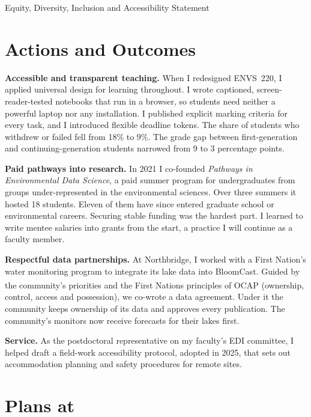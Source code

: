 \begin{applicationdocument}[
  short      = {EDIA Statement},
  page limit = 2,
]{Equity, Diversity, Inclusion and Accessibility Statement}
\section{Actions and Outcomes}


\textbf{Accessible and transparent teaching.} When I redesigned ENVS~220, I
applied universal design for learning throughout. I wrote captioned,
screen-reader-tested notebooks that run in a browser, so students need
neither a powerful laptop nor any installation. I published explicit
marking criteria for every task, and I introduced flexible deadline tokens.
The share of students who withdrew or failed fell from 18\% to 9\%. The
grade gap between first-generation and continuing-generation students
narrowed from 9 to 3 percentage points.

\textbf{Paid pathways into research.} In 2021 I co-founded \emph{Pathways in
Environmental Data Science}, a paid summer program for undergraduates
from groups under-represented in the environmental sciences. Over three
summers it hosted 18 students. Eleven of them have since entered graduate
school or environmental careers. Securing stable funding was the
hardest part. I learned to write mentee salaries into grants from the
start, a practice I will continue as a faculty member.

\textbf{Respectful data partnerships.} At Northbridge, I worked with a
First Nation's water monitoring program to integrate its lake data into
BloomCast. Guided by the community's priorities and the First Nations
principles of OCAP\textsuperscript{\textregistered} (ownership, control,
access and possession), we co-wrote a data agreement. Under it the
community keeps ownership of its data and approves every publication. The
community's monitors now receive forecasts for their lakes first.

\textbf{Service.} As the postdoctoral representative on my faculty's EDI
committee, I helped draft a field-work accessibility protocol, adopted in
2025, that sets out accommodation planning and safety procedures for
remote sites.

\section{Plans at \Institution}


\end{applicationdocument}
